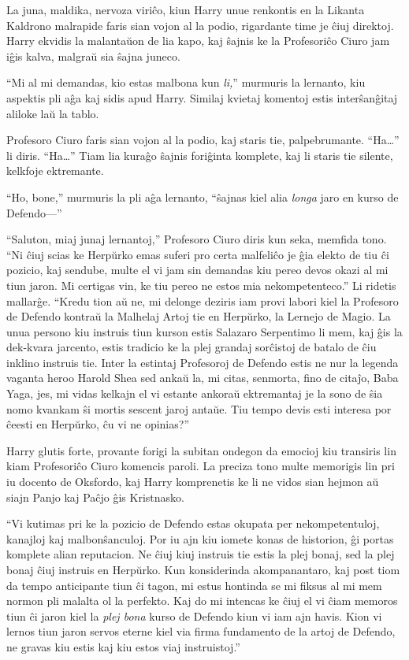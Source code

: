 La juna, maldika, nervoza viriĉo, kiun Harry unue renkontis en la
Likanta Kaldrono malrapide faris sian vojon al la podio, rigardante
time je ĉiuj direktoj. Harry ekvidis la malantaŭon de lia kapo, kaj
ŝajnis ke la Profesoriĉo Ciuro jam iĝis kalva, malgraŭ sia ŝajna
juneco.

``Mi al mi demandas, kio estas malbona kun \emph{li,}'' murmuris la
lernanto, kiu aspektis pli aĝa kaj sidis apud Harry. Similaj kvietaj
komentoj estis interŝanĝitaj aliloke laŭ la tablo.

Profesoro Ciuro faris sian vojon al la podio, kaj staris tie,
palpebrumante. ``Ha\ldots'' li diris. ``Ha\ldots'' Tiam lia kuraĝo
ŝajnis foriĝinta komplete, kaj li staris tie silente, kelkfoje
ektremante.

``Ho, bone,'' murmuris la pli aĝa lernanto, ``ŝajnas kiel alia
\emph{longa} jaro en kurso de Defendo—''

``Saluton, miaj junaj lernantoj,'' Profesoro Ciuro diris kun seka,
memfida tono. ``Ni ĉiuj scias ke Herpŭrko emas suferi pro certa
malfeliĉo je ĝia elekto de tiu ĉi pozicio, kaj sendube, multe el vi
jam sin demandas kiu pereo devos okazi al mi tiun jaron. Mi certigas
vin, ke tiu pereo ne estos mia nekompetenteco.'' Li ridetis
mallarĝe. ``Kredu tion aŭ ne, mi delonge deziris iam provi labori kiel
la Profesoro de Defendo kontraŭ la Malhelaj Artoj tie en Herpŭrko, la
Lernejo de Magio. La unua persono kiu instruis tiun kurson estis
Salazaro Serpentimo li mem, kaj ĝis la dek-kvara jarcento, estis
tradicio ke la plej grandaj sorĉistoj de batalo de ĉiu inklino
instruis tie. Inter la estintaj Profesoroj de Defendo estis ne nur la
legenda vaganta heroo Harold Shea sed ankaŭ la, mi citas, senmorta,
fino de citaĵo, Baba Yaga, jes, mi vidas kelkajn el vi estante ankoraŭ
ektremantaj je la sono de ŝia nomo kvankam ŝi mortis sescent jaroj
antaŭe. Tiu tempo devis esti interesa por ĉeesti en Herpŭrko, ĉu vi ne
opinias?''

Harry glutis forte, provante forigi la subitan ondegon da emocioj kiu
transiris lin kiam Profesoriĉo Ciuro komencis paroli. La preciza tono
multe memorigis lin pri iu docento de Oksfordo, kaj Harry komprenetis
ke li ne vidos sian hejmon aŭ siajn Panjo kaj Paĉjo ĝis Kristnasko.

``Vi kutimas pri ke la pozicio de Defendo estas okupata per
nekompetentuloj, kanajloj kaj malbonŝanculoj. Por iu ajn kiu iomete
konas de historion, ĝi portas komplete alian reputacion. Ne ĉiuj kiuj
instruis tie estis la plej bonaj, sed la plej bonaj ĉiuj instruis en
Herpŭrko. Kun konsiderinda akompanantaro, kaj post tiom da tempo
anticipante tiun ĉi tagon, mi estus hontinda se mi fiksus al mi mem
normon pli malalta ol la perfekto. Kaj do mi intencas ke ĉiuj el vi
ĉiam memoros tiun ĉi jaron kiel la \emph{plej bona} kurso de Defendo
kiun vi iam ajn havis. Kion vi lernos tiun jaron servos eterne kiel
via firma fundamento de la artoj de Defendo, ne gravas kiu estis kaj
kiu estos viaj instruistoj.''

